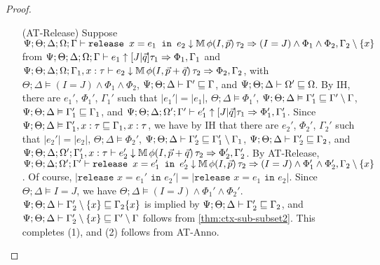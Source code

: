 \begin{proof}
\begin{itemize}
  \item[(AT-Release)] Suppose
  $\Psi ; \Theta ; \Delta ; \Omega ; \Gamma \vdash \texttt{release } x = e_1 \texttt{ in }e_2 \downarrow \mathbb{M} \, \phi(I,\vec{p}) \, \tau_2 \Rightarrow (I = J) \wedge \Phi_1 \wedge \Phi_2, \Gamma_2 \setminus \{x\}$ from
  $\Psi ; \Theta ; \Delta ; \Omega ; \Gamma \vdash e_1 \uparrow [J | \vec{q}] \tau_1 \Rightarrow \Phi_1,\Gamma_1$ and
  $\Psi ; \Theta ; \Delta ; \Omega ; \Gamma_1, x : \tau \vdash e_2 \downarrow \mathbb{M} \, \phi(I,\vec{p} + \vec{q}) \, \tau_2 \Rightarrow \Phi_2, \Gamma_2$, with
  $\Theta ; \Delta \vDash (I = J) \wedge \Phi_1 \wedge \Phi_2$,
  $\Psi ; \Theta ; \Delta \vdash \Gamma' \sqsubseteq \Gamma$, and
  $\Psi ; \Theta ; \Delta \vdash \Omega' \sqsubseteq \Omega$.
  By IH, there are $e_1'$, $\Phi_1'$, $\Gamma_1'$ such that
  $|e_1'| = |e_1|$,
  $\Theta ; \Delta \vDash \Phi_1'$,
  $\Psi ; \Theta ; \Delta \vDash \Gamma_1' \sqsubseteq \Gamma' \setminus \Gamma$,
  $\Psi ; \Theta ; \Delta \vDash \Gamma_1' \sqsubseteq \Gamma_1$, and
  $\Psi ; \Theta ; \Delta ; \Omega' ; \Gamma' \vdash e_1' \uparrow [J|\vec{q}] \tau_1 \Rightarrow \Phi_1',\Gamma_1'$.
  Since $\Psi ; \Theta ; \Delta \vDash \Gamma_1', x : \tau \sqsubseteq \Gamma_1, x : \tau$, we have
  by IH that there are $e_2'$, $\Phi_2'$, $\Gamma_2'$ such that
  $|e_2'| = |e_2|$,
  $\Theta ; \Delta \vDash \Phi_2'$,
  $\Psi ; \Theta ; \Delta \vdash \Gamma_2' \sqsubseteq \Gamma_1' \setminus \Gamma_1$,
  $\Psi ; \Theta ; \Delta \vdash \Gamma_2' \sqsubseteq \Gamma_2$, and
  $\Psi ; \Theta ; \Delta ; \Omega' ; \Gamma_1', x : \tau \vdash e_2' \downarrow \mathbb{M} \, \phi(I,\vec{p} + \vec{q}) \, \tau_2 \Rightarrow \Phi_2',\Gamma_2'$.
  By AT-Release,
  $\Psi ; \Theta ; \Delta ; \Omega' ; \Gamma' \vdash \texttt{release } x = e_1' \texttt{ in }e_2' \downarrow \mathbb{M} \, \phi(I,\vec{p}) \, \tau_2 \Rightarrow (I = J) \wedge \Phi_1' \wedge \Phi_2', \Gamma_2 \setminus \{x\}$.
  Of course, $|\texttt{release } x = e_1' \texttt{ in }e_2'| = |\texttt{release } x = e_1 \texttt{ in }e_2|$.
  Since $\Theta ; \Delta \vDash I = J$, we have $\Theta ; \Delta \vDash (I = J) \wedge \Phi_1' \wedge \Phi_2'$.
  $\Psi ; \Theta ; \Delta \vdash \Gamma_2' \setminus \{x\} \sqsubseteq \Gamma_2 \{x\}$ is implied by $\Psi ; \Theta ; \Delta \vdash \Gamma_2' \sqsubseteq \Gamma_2$,
  and $\Psi ; \Theta ; \Delta \vdash \Gamma_2' \setminus \{x\} \sqsubseteq \Gamma' \setminus \Gamma$ follows from \autoref{thm:ctx-sub-subset2}. This completes (1), and (2) follows from AT-Anno.
  

\end{itemize}
\end{proof}
